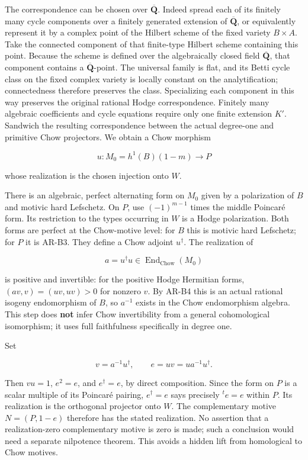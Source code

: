 \documentclass[11pt,a4paper]{article}
\begin{document}
The correspondence can be chosen over \(\overline{\mathbf Q}\). Indeed
spread each of its finitely many cycle components over a finitely
generated extension of \(\overline{\mathbf Q}\), or equivalently
represent it by a complex point of the Hilbert scheme of the fixed
variety \(B\times A\). Take the connected component of that finite-type
Hilbert scheme containing this point. Because the scheme is defined over
the algebraically closed field \(\overline{\mathbf Q}\), that component
contains a \(\overline{\mathbf Q}\)-point. The universal family is flat,
and its Betti cycle class on the fixed complex variety is locally
constant on the analytification; connectedness therefore preserves the
class. Specializing each component in this way preserves the original
rational Hodge correspondence. Finitely many algebraic coefficients and
cycle equations require only one finite extension \(K'\). Sandwich the
resulting correspondence between the actual degree-one and primitive
Chow projectors. We obtain a Chow morphism

\[
u:M_0=h^1(B)(1-m)\longrightarrow P
\]

whose realization is the chosen injection onto \(W\).

There is an algebraic, perfect alternating form on \(M_0\) given by a
polarization of \(B\) and motivic hard Lefschetz. On \(P\), use
\((-1)^{m-1}\) times the middle Poincaré form. Its restriction to the
types occurring in \(W\) is a Hodge polarization. Both forms are perfect
at the Chow-motive level: for \(B\) this is motivic hard Lefschetz; for
\(P\) it is AR-B3. They define a Chow adjoint \(u^\dagger\). The
realization of

\[
a=u^\dagger u\in\operatorname{End}_{\mathrm{Chow}}(M_0)
\]

is positive and invertible: for the positive Hodge Hermitian forms,
\((av,v)=(uv,uv)>0\) for nonzero \(v\). By AR-B4 this is an actual
rational isogeny endomorphism of \(B\), so \(a^{-1}\) exists in the Chow
endomorphism algebra. This step does \textbf{not} infer Chow
invertibility from a general cohomological isomorphism; it uses full
faithfulness specifically in degree one.

Set

\[
v=a^{-1}u^\dagger,\qquad e=uv=u a^{-1}u^\dagger.
\]

Then \(vu=1\), \(e^2=e\), and \(e^\dagger=e\), by direct composition.
Since the form on \(P\) is a scalar multiple of its Poincaré pairing,
\(e^\dagger=e\) says precisely \({}^t e=e\) within \(P\). Its
realization is the orthogonal projector onto \(W\). The complementary
motive \(N=(P,1-e)\) therefore has the stated realization. No assertion
that a realization-zero complementary motive is zero is made; such a
conclusion would need a separate nilpotence theorem. This avoids a
hidden lift from homological to Chow motives.
\end{document}
